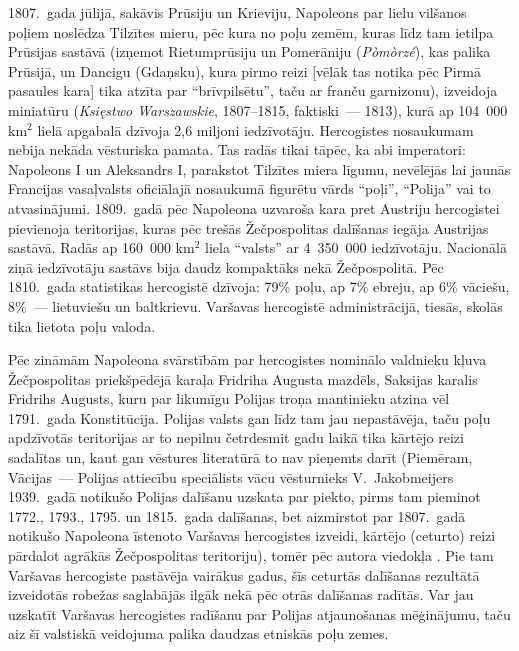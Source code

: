 \documentclass[twoside,a5paper,12pt,fleqn,openany]{extbook}
\newcommand{\pltxti}[1]{\textit{\textpolish{#1}}}
\begin{document}
1807.~gada jūlijā, sakāvis Prūsiju un Krieviju, Napoleons par lielu vilšanos poļiem noslēdza Tilzītes mieru, pēc kura no poļu zemēm, kuras līdz tam ietilpa Prūsijas sastāvā (izņemot Rietumprūsiju un Pomerāniju (\pltxti{Pòmòrzé}), kas palika Prūsijā, un Dancigu (Gdaņsku), kura pirmo reizi [vēlāk tas notika pēc Pirmā pasaules kara] tika atzīta par ``brīvpilsētu'', taču ar franču garnizonu), izveidoja miniatūru  (\pltxti{Księstwo Warszawskie}, 1807--1815, faktiski~--- 1813), kurā ap 104~000 km$^{2}$ lielā apgabalā dzīvoja 2,6 miljoni iedzīvotāju. Hercogistes nosaukumam nebija nekāda vēsturiska pamata. Tas radās tikai tāpēc, ka abi imperatori: Napoleons I un Aleksandrs I, parakstot Tilzītes miera līgumu, nevēlējās lai jaunās Francijas vasaļvalsts oficiālajā nosaukumā figurētu vārds ``poļi'', ``Polija'' vai to atvasinājumi. 1809.~gadā pēc Napoleona uzvaroša kara pret Austriju hercogistei pievienoja teritorijas, kuras pēc trešās Žečpospolitas dalīšanas iegāja Austrijas sastāvā. Radās ap 160~000 km$^{2}$ liela ``valsts'' ar 4~350~000 iedzīvotāju. Nacionālā ziņā iedzīvotāju sastāvs bija daudz kompaktāks nekā Žečpospolitā. Pēc 1810.~gada statistikas hercogistē dzīvoja: 79\% poļu, ap 7\% ebreju, ap 6\% vāciešu, 8\%~--- lietuviešu un baltkrievu. Varšavas hercogistē administrācijā, tiesās, skolās tika lietota poļu valoda.

Pēc zināmām Napoleona svārstībām par hercogistes nominālo valdnieku kļuva Žečpospolitas priekšpēdējā karaļa Fridriha Augusta mazdēls, Saksijas karalis Fridrihs Augusts, kuru par likumīgu Polijas troņa mantinieku atzina vēl 1791.~gada Konstitūcija. Polijas valsts gan līdz tam jau nepastāvēja, taču poļu apdzīvotās teritorijas ar to nepilnu četrdesmit gadu laikā tika kārtējo reizi sadalītas un, kaut gan vēstures literatūrā to nav pieņemts darīt (Piemēram, Vācijas~--- Polijas attiecību speciālists vācu vēsturnieks V.~Jakobmeijers 1939.~gadā notikušo Polijas dalīšanu uzskata par piekto, pirms tam pieminot 1772., 1793., 1795. un 1815.~gada dalīšanas, bet aizmirstot par 1807.~gadā notikušo Napoleona īstenoto Varšavas hercogistes izveidi, kārtējo (ceturto) reizi pārdalot agrākās Žečpospolitas teritoriju), tomēr pēc autora viedokļa . Pie tam Varšavas hercogiste pastāvēja vairākus gadus, šīs ceturtās dalīšanas rezultātā izveidotās robežas saglabājās ilgāk nekā pēc otrās dalīšanas radītās. Var jau uzskatīt Varšavas hercogistes radīšanu par Polijas atjaunošanas mēģinājumu, taču aiz šī valstiskā veidojuma palika daudzas etniskās poļu zemes.
\end{document}
